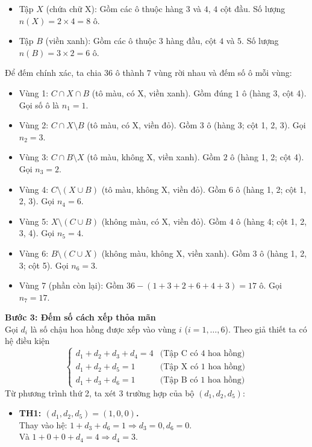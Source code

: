 \begin{ex}
{\begin{itemize}
			\item Tập $X$ (chứa chữ X): Gồm các ô thuộc hàng $3$ và $4$, $4$ cột đầu. Số lượng $n(X) = 2 \times 4 = 8$ ô.
			\item Tập $B$ (viền xanh): Gồm các ô thuộc $3$ hàng đầu, cột $4$ và $5$. Số lượng $n(B) = 3 \times 2 = 6$ ô.
		\end{itemize}
		Để đếm chính xác, ta chia $36$ ô thành $7$ vùng rời nhau và đếm số ô mỗi vùng:
		\begin{itemize}
			\item Vùng 1: $C \cap X \cap B$ (tô màu, có X, viền xanh). Gồm đúng $1$ ô (hàng 3, cột 4). Gọi số ô là $n_1 = 1$.
			\item Vùng 2: $C \cap X \setminus B$ (tô màu, có X, viền đỏ). Gồm $3$ ô (hàng 3; cột 1, 2, 3). Gọi $n_2 = 3$.
			\item Vùng 3: $C \cap B \setminus X$ (tô màu, không X, viền xanh). Gồm $2$ ô (hàng 1, 2; cột 4). Gọi $n_3 = 2$.
			\item Vùng 4: $C \setminus (X \cup B)$ (tô màu, không X, viền đỏ). Gồm $6$ ô (hàng 1, 2; cột 1, 2, 3). Gọi $n_4 = 6$.
			\item Vùng 5: $X \setminus (C \cup B)$ (không màu, có X, viền đỏ). Gồm $4$ ô (hàng 4; cột 1, 2, 3, 4). Gọi $n_5 = 4$.
			\item Vùng 6: $B \setminus (C \cup X)$ (không màu, không X, viền xanh). Gồm $3$ ô (hàng 1, 2, 3; cột 5). Gọi $n_6 = 3$.
			\item Vùng 7 (phần còn lại): Gồm $36 - (1+3+2+6+4+3) = 17$ ô. Gọi $n_7 = 17$.
		\end{itemize}
		\textbf{Bước 3: Đếm số cách xếp thỏa mãn}\\
		Gọi $d_i$ là số chậu hoa hồng được xếp vào vùng $i$ ($i=1,\dots,6$). Theo giả thiết ta có hệ điều kiện
		$$\begin{cases}
			d_1 + d_2 + d_3 + d_4 = 4 & \text{(Tập C có 4 hoa hồng)} \\
			d_1 + d_2 + d_5 = 1 & \text{(Tập X có 1 hoa hồng)} \\
			d_1 + d_3 + d_6 = 1 & \text{(Tập B có 1 hoa hồng)}
		\end{cases}$$
		Từ phương trình thứ 2, ta xét $3$ trường hợp của bộ $(d_1, d_2, d_5)$:
		\begin{itemize}
			\item \textbf{TH1: $(d_1, d_2, d_5) = (1, 0, 0)$.}\\
			Thay vào hệ: $1 + d_3 + d_6 = 1 \Rightarrow d_3=0, d_6=0$. \\
			Và $1 + 0 + 0 + d_4 = 4 \Rightarrow d_4=3$. \\

\end{itemize}}
\end{ex}
